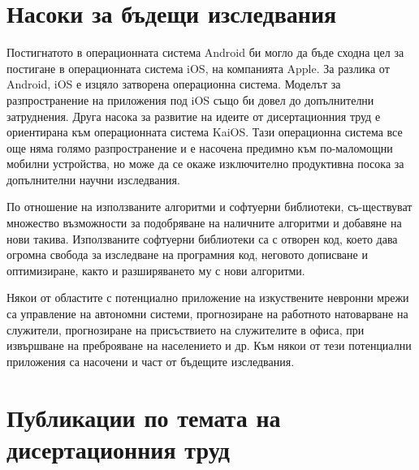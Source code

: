 \section*{Насоки за бъдещи изследвания}

Постигнатото в операционната система Android би могло да бъде сходна цел за постигане в операционната система iOS, на компанията Apple. За разлика от Android, iOS е изцяло затворена операционна система. Моделът за разпространение на приложения под iOS също би довел до допълнителни затруднения. Друга насока за развитие на идеите от дисертационния труд е ориентирана към операционната система KaiOS. Тази операционна система все още няма голямо разпространение и е насочена предимно към по-маломощни мобилни устройства, но може да се окаже изключително продуктивна посока за допълнителни научни изследвания.

По отношение на използваните алгоритми и софтуерни библиотеки, съ-ществуват множество възможности за подобряване на наличните алгоритми и добавяне на нови такива. Използваните софтуерни библиотеки са с отворен код, което дава огромна свобода за изследване на програмния код, неговото дописване и оптимизиране, както и разширяването му с нови алгоритми.

Някои от областите с потенциално приложение на изкуствените невронни мрежи са управление на автономни системи, прогнозиране на работното натоварване на служители, прогнозиране на присъствието на служителите в офиса, при извършване на преброяване на населението и др. Към някои от тези потенциални приложения са  насочени и част от бъдещите изследвания.

\newpage

\section*{Публикации по темата на дисертационния труд}

